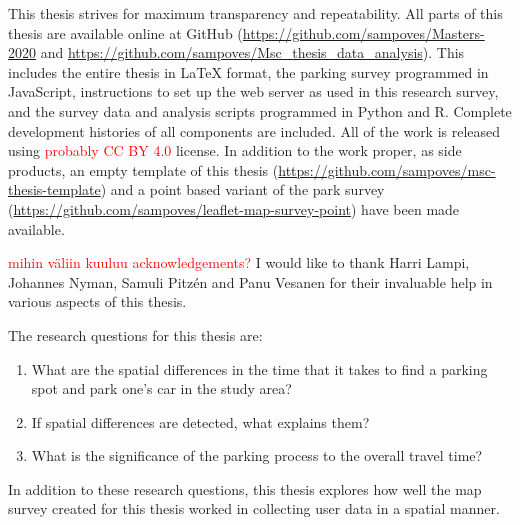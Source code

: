 This thesis strives for maximum transparency and repeatability. All parts of this thesis are available online at GitHub (\textcolor{blue}{\url{https://github.com/sampoves/Masters-2020}} and \textcolor{blue}{\url{https://github.com/sampoves/Msc_thesis_data_analysis}}). This includes the entire thesis in LaTeX format, the parking survey programmed in JavaScript, instructions to set up the web server as used in this research survey, and the survey data and analysis scripts programmed in Python and R. Complete development histories of all components are included. All of the work is released using \textcolor{red}{probably CC BY 4.0} license. In addition to the work proper, as side products, an empty template of this thesis (\textcolor{blue}{\url{https://github.com/sampoves/msc-thesis-template}}) and a point based variant of the park survey (\textcolor{blue}{\url{https://github.com/sampoves/leaflet-map-survey-point}}) have been made available.

\textcolor{red}{mihin väliin kuuluu acknowledgements?} I would like to thank Harri Lampi, Johannes Nyman, Samuli Pitzén and Panu Vesanen for their invaluable help in various aspects of this thesis.

\bigskip
\noindent
The research questions for this thesis are:

\begin{spacing}{1}
    \begin{enumerate}[label=\Roman*]
      \item What are the spatial differences in the time that it takes to find a parking spot and park one’s car in the study area?
      \item If spatial differences are detected, what explains them?
      \item What is the significance of the parking process to the overall travel time?
    \end{enumerate}
\end{spacing}
\bigskip
In addition to these research questions, this thesis explores how well the map survey created for this thesis worked in collecting user data in a spatial manner.